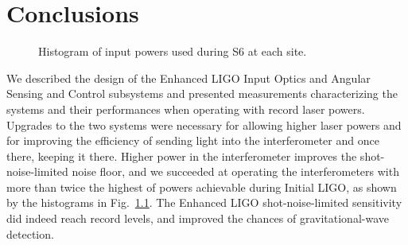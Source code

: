 \chapter{Conclusions}

\begin{figure}
\begin{centering}
\caption[Histogram of input powers used during S6]{Histogram of input
  powers used during S6 at each site.}
\label{fig:S6pwrs}
\end{centering}
\end{figure}

We described the design of the Enhanced LIGO Input Optics and Angular
Sensing and Control subsystems and presented measurements
characterizing the systems and their performances when operating with
record laser powers. Upgrades to the two systems were necessary for
allowing higher laser powers and for improving the efficiency of
sending light into the interferometer and once there, keeping it
there. Higher power in the interferometer improves the
shot-noise-limited noise floor, and we succeeded at operating the
interferometers with more than twice the highest of powers achievable
during Initial LIGO, as shown by the histograms in
Fig.~\ref{fig:S6pwrs}. The Enhanced LIGO shot-noise-limited
sensitivity did indeed reach record levels, and improved the chances
of gravitational-wave detection.


